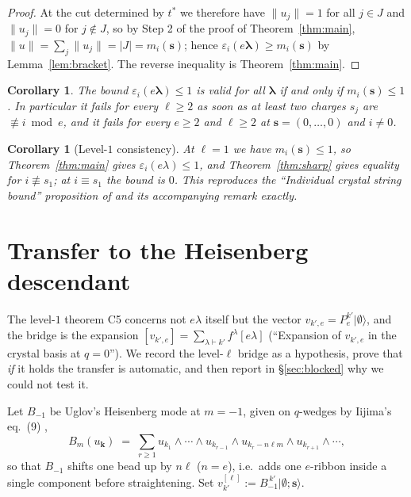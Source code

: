 \documentclass[11pt]{article}
\newtheorem{corollary}[theorem]{Corollary}
\theoremstyle{definition}
\newcommand{\eps}{\varepsilon}
\newcommand{\bs}{\mathbf{s}}
\newcommand{\blam}{\boldsymbol{\lambda}}
\newcommand{\bemp}{\boldsymbol{\emptyset}}
\newcommand{\Bmi}{B_{-1}}
\newcommand{\vke}{v_{k',e}}
\begin{document}
\begin{proof}
At the cut determined by $t^\ast$ we therefore have $\|u_j\| = 1$ for all
$j \in J$ and $\|u_j\| = 0$ for $j \notin J$, so by Step 2 of the proof of
Theorem~\ref{thm:main},
$\|u\| = \sum_j \|u_j\| = |J| = m_i(\bs)$; hence
$\eps_i(e\blam) \ge m_i(\bs)$ by Lemma~\ref{lem:bracket}. The reverse
inequality is Theorem~\ref{thm:main}.
\end{proof}

\begin{corollary}\label{cor:notlevelindep}
The bound $\eps_i(e\blam) \le 1$ is valid for all $\blam$ if and only if
$m_i(\bs) \le 1$. In particular it fails for every $\ell \ge 2$ as soon as
at least two charges $s_j$ are $\not\equiv i \bmod e$, and it fails for
every $e \ge 2$ and $\ell \ge 2$ at $\bs = (0,\dots,0)$ and $i \ne 0$.
\end{corollary}

\begin{corollary}[Level-$1$ consistency]\label{cor:lvl1}
At $\ell = 1$ we have $m_i(\bs) \le 1$, so Theorem~\ref{thm:main} gives
$\eps_i(e\lambda) \le 1$, and Theorem~\ref{thm:sharp} gives equality for
$i \not\equiv s_1$; at $i \equiv s_1$ the bound is $0$. This reproduces
the ``Individual crystal string bound'' proposition of
\cite{Clio-C5-2026-08-11} and its accompanying remark exactly.
\end{corollary}

\section{Transfer to the Heisenberg descendant}\label{sec:transfer}

The level-$1$ theorem C5 concerns not $e\lambda$ itself but the vector
$v_{k',e} = P_e^{k'}|\emptyset\rangle$, and the bridge is the expansion
$[v_{k',e}] = \sum_{\lambda \vdash k'} f^\lambda [e\lambda]$
\cite{Clio-C5-2026-08-11} (``Expansion of $\vke$ in the crystal basis at $q=0$''). We record the level-$\ell$ bridge as
a hypothesis, prove that \emph{if} it holds the transfer is automatic, and
then report in \S\ref{sec:blocked} why we could not test it.

Let $\Bmi$ be Uglov's Heisenberg mode at $m = -1$, given on $q$-wedges by
Iijima's eq.~(9) \cite[eq.~(9)]{Iijima2012},
\[
  B_m(u_{\mathbf k}) \;=\; \sum_{r \ge 1}
    u_{k_1} \wedge \cdots \wedge u_{k_{r-1}} \wedge u_{k_r - n\ell m}
    \wedge u_{k_{r+1}} \wedge \cdots ,
\]
so that $\Bmi$ shifts one bead up by $n\ell$ ($n = e$), i.e.\ adds one
$e$-ribbon inside a single component before straightening. Set
$v^{[\ell]}_{k'} := \Bmi^{\,k'}|\bemp;\bs\rangle$.
\end{document}
